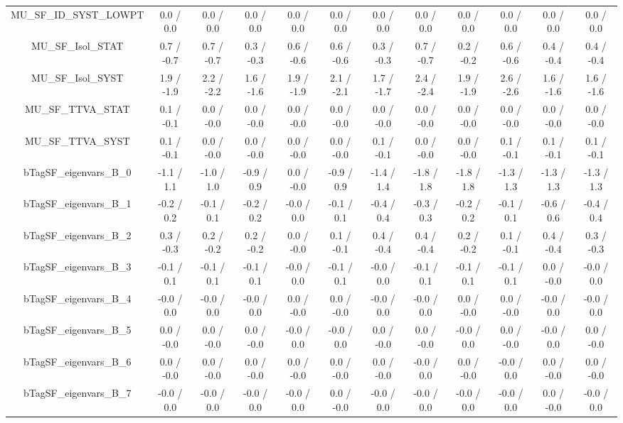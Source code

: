 \begin{table}[htbp]
\begin{center}
\begin{tabular}{|c|c|c|c|c|c|c|c|c|c|c|c|}
  MU_SF_ID_SYST_LOWPT & 0.0 / 0.0 & 0.0 / 0.0 & 0.0 / 0.0 & 0.0 / 0.0 & 0.0 / 0.0 & 0.0 / 0.0 & 0.0 / 0.0 & 0.0 / 0.0 & 0.0 / 0.0 & 0.0 / 0.0 & 0.0 / 0.0 \\ 
  MU_SF_Isol_STAT & 0.7 / -0.7 & 0.7 / -0.7 & 0.3 / -0.3 & 0.6 / -0.6 & 0.6 / -0.6 & 0.3 / -0.3 & 0.7 / -0.7 & 0.2 / -0.2 & 0.6 / -0.6 & 0.4 / -0.4 & 0.4 / -0.4 \\ 
  MU_SF_Isol_SYST & 1.9 / -1.9 & 2.2 / -2.2 & 1.6 / -1.6 & 1.9 / -1.9 & 2.1 / -2.1 & 1.7 / -1.7 & 2.4 / -2.4 & 1.9 / -1.9 & 2.6 / -2.6 & 1.6 / -1.6 & 1.6 / -1.6 \\ 
  MU_SF_TTVA_STAT & 0.1 / -0.1 & 0.0 / -0.0 & 0.0 / -0.0 & 0.0 / -0.0 & 0.0 / -0.0 & 0.0 / -0.0 & 0.0 / -0.0 & 0.0 / -0.0 & 0.0 / -0.0 & 0.0 / -0.0 & 0.0 / -0.0 \\ 
  MU_SF_TTVA_SYST & 0.1 / -0.1 & 0.0 / -0.0 & 0.0 / -0.0 & 0.0 / -0.0 & 0.0 / -0.0 & 0.1 / -0.1 & 0.0 / -0.0 & 0.0 / -0.0 & 0.1 / -0.1 & 0.1 / -0.1 & 0.1 / -0.1 \\ 
  bTagSF_eigenvars_B_0 & -1.1 / 1.1 & -1.0 / 1.0 & -0.9 / 0.9 & 0.0 / -0.0 & -0.9 / 0.9 & -1.4 / 1.4 & -1.8 / 1.8 & -1.8 / 1.8 & -1.3 / 1.3 & -1.3 / 1.3 & -1.3 / 1.3 \\ 
  bTagSF_eigenvars_B_1 & -0.2 / 0.2 & -0.1 / 0.1 & -0.2 / 0.2 & -0.0 / 0.0 & -0.1 / 0.1 & -0.4 / 0.4 & -0.3 / 0.3 & -0.2 / 0.2 & -0.1 / 0.1 & -0.6 / 0.6 & -0.4 / 0.4 \\ 
  bTagSF_eigenvars_B_2 & 0.3 / -0.3 & 0.2 / -0.2 & 0.2 / -0.2 & 0.0 / -0.0 & 0.1 / -0.1 & 0.4 / -0.4 & 0.4 / -0.4 & 0.2 / -0.2 & 0.1 / -0.1 & 0.4 / -0.4 & 0.3 / -0.3 \\ 
  bTagSF_eigenvars_B_3 & -0.1 / 0.1 & -0.1 / 0.1 & -0.1 / 0.1 & -0.0 / 0.0 & -0.1 / 0.1 & -0.0 / 0.0 & -0.1 / 0.1 & -0.1 / 0.1 & -0.1 / 0.1 & 0.0 / -0.0 & -0.0 / 0.0 \\ 
  bTagSF_eigenvars_B_4 & -0.0 / 0.0 & -0.0 / 0.0 & -0.0 / 0.0 & 0.0 / -0.0 & 0.0 / -0.0 & -0.0 / 0.0 & -0.0 / 0.0 & 0.0 / -0.0 & 0.0 / -0.0 & -0.0 / 0.0 & -0.0 / 0.0 \\ 
  bTagSF_eigenvars_B_5 & 0.0 / -0.0 & 0.0 / -0.0 & 0.0 / -0.0 & -0.0 / 0.0 & -0.0 / 0.0 & 0.0 / -0.0 & 0.0 / -0.0 & -0.0 / 0.0 & 0.0 / -0.0 & -0.0 / 0.0 & 0.0 / -0.0 \\ 
  bTagSF_eigenvars_B_6 & 0.0 / -0.0 & 0.0 / -0.0 & 0.0 / -0.0 & 0.0 / -0.0 & 0.0 / -0.0 & 0.0 / -0.0 & -0.0 / 0.0 & 0.0 / -0.0 & -0.0 / 0.0 & 0.0 / -0.0 & 0.0 / -0.0 \\ 
  bTagSF_eigenvars_B_7 & -0.0 / 0.0 & -0.0 / 0.0 & -0.0 / 0.0 & -0.0 / 0.0 & 0.0 / -0.0 & -0.0 / 0.0 & -0.0 / 0.0 & -0.0 / 0.0 & -0.0 / 0.0 & 0.0 / -0.0 & -0.0 / 0.0 \\ 

\end{tabular}
\end{center}
\end{table}
